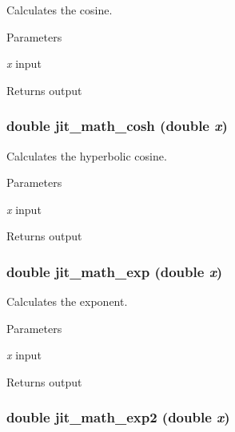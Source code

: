 Calculates the cosine. 
\begin{DoxyParams}{Parameters}
\item[{\em x}]input \end{DoxyParams}
\begin{DoxyReturn}{Returns}
output 
\end{DoxyReturn}
\hypertarget{group__mathmod_ga23657d5e9c6e97a95e5aaf6484ac4267}{
\subsubsection[{jit\_\-math\_\-cosh}]{\setlength{\rightskip}{0pt plus 5cm}double jit\_\-math\_\-cosh (double {\em x})}}
\label{group__mathmod_ga23657d5e9c6e97a95e5aaf6484ac4267}


Calculates the hyperbolic cosine. 
\begin{DoxyParams}{Parameters}
\item[{\em x}]input \end{DoxyParams}
\begin{DoxyReturn}{Returns}
output 
\end{DoxyReturn}
\hypertarget{group__mathmod_ga7bb1ea70eca67afe4c3f4d8581cf45cb}{
\subsubsection[{jit\_\-math\_\-exp}]{\setlength{\rightskip}{0pt plus 5cm}double jit\_\-math\_\-exp (double {\em x})}}
\label{group__mathmod_ga7bb1ea70eca67afe4c3f4d8581cf45cb}


Calculates the exponent. 
\begin{DoxyParams}{Parameters}
\item[{\em x}]input \end{DoxyParams}
\begin{DoxyReturn}{Returns}
output 
\end{DoxyReturn}
\hypertarget{group__mathmod_gafc4e924e75bba7f486c72a1177accb89}{
\subsubsection[{jit\_\-math\_\-exp2}]{\setlength{\rightskip}{0pt plus 5cm}double jit\_\-math\_\-exp2 (double {\em x})}}
\label{group__mathmod_gafc4e924e75bba7f486c72a1177accb89}



